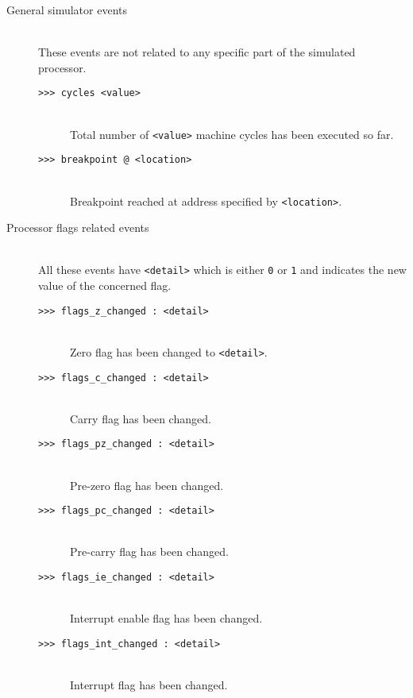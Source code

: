         \begin{description}
            \item[General simulator events]~\\
                These events are not related to any specific part of the simulated processor.
                \begin{description}
                    \item[\texttt{>{}>{}> cycles <value>}]~\\
                        Total number of \texttt{<value>} machine cycles has been executed so far.
                    \item[\texttt{>{}>{}> breakpoint @ <location>}]~\\
                        Breakpoint reached at address specified by \texttt{<location>}.
                \end{description}

            \item[Processor flags related events]~\\
                All these events have \texttt{<detail>} which is either \texttt{0} or \texttt{1} and indicates the new value of the concerned flag.
                \begin{description}
                    \item[\texttt{>{}>{}> flags\_z\_changed : <detail>}]~\\
                        Zero flag has been changed to \texttt{<detail>}.
                    \item[\texttt{>{}>{}> flags\_c\_changed : <detail>}]~\\
                        Carry flag has been changed.
                    \item[\texttt{>{}>{}> flags\_pz\_changed : <detail>}]~\\
                        Pre-zero flag has been changed.
                    \item[\texttt{>{}>{}> flags\_pc\_changed : <detail>}]~\\
                        Pre-carry flag has been changed.
                    \item[\texttt{>{}>{}> flags\_ie\_changed : <detail>}]~\\
                        Interrupt enable flag has been changed.
                    \item[\texttt{>{}>{}> flags\_int\_changed : <detail>}]~\\
                        Interrupt flag has been changed.
                \end{description}


\end{description}

